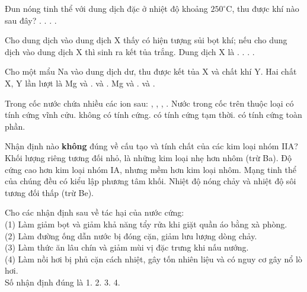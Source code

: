 \documentclass[11pt,a4paper]{article}
\def\loigiai#1{}
\begin{document}
\begin{ex}
Đun nóng tinh thể  với dung dịch  đặc ở nhiệt độ khoảng $250^\circ\text{C}$, thu được khí nào sau đây?
\choice
{.}
{.}
{.}
{.}
\loigiai{}
\end{ex}

\begin{ex}
Cho dung dịch  vào dung dịch X thấy có hiện tượng sủi bọt khí; nếu cho dung dịch  vào dung dịch X thì sinh ra kết tủa trắng. Dung dịch X là
\choice
{.}
{.}
{.}
{.}
\loigiai{}
\end{ex}

\begin{ex}
Cho một mẩu Na vào dung dịch  dư, thu được kết tủa X và chất khí Y. Hai chất X, Y lần lượt là
\choice
{Mg và .}
{ và .}
{Mg và .}
{ và .}
\loigiai{}
\end{ex}

\begin{ex}
Trong cốc nước chứa nhiều các ion sau: , , , . Nước trong cốc trên thuộc loại
\choice
{có tính cứng vĩnh cửu.}
{không có tính cứng.}
{có tính cứng tạm thời.}
{có tính cứng toàn phần.}
\loigiai{}
\end{ex}

\begin{ex}
Nhận định nào \textbf{không} đúng về cấu tạo và tính chất của các kim loại nhóm IIA?
\choice
{Khối lượng riêng tương đối nhỏ, là những kim loại nhẹ hơn nhôm (trừ Ba).}
{Độ cứng cao hơn kim loại nhóm IA, nhưng mềm hơn kim loại nhôm.}
{Mạng tinh thể của chúng đều có kiểu lập phương tâm khối.}
{Nhiệt độ nóng chảy và nhiệt độ sôi tương đối thấp (trừ Be).}
\loigiai{}
\end{ex}

\begin{ex}
Cho các nhận định sau về tác hại của nước cứng:\\
(1) Làm giảm bọt và giảm khả năng tẩy rửa khi giặt quần áo bằng xà phòng.\\
(2) Làm đường ống dẫn nước bị đóng cặn, giảm lưu lượng dòng chảy.\\
(3) Làm thức ăn lâu chín và giảm mùi vị đặc trưng khi nấu nướng.\\
(4) Làm nồi hơi bị phủ cặn cách nhiệt, gây tốn nhiên liệu và có nguy cơ gây nổ lò hơi.\\
Số nhận định đúng là
\choice
{1.}
{2.}
{3.}
{4.}
\loigiai{}
\end{ex}
\end{document}
